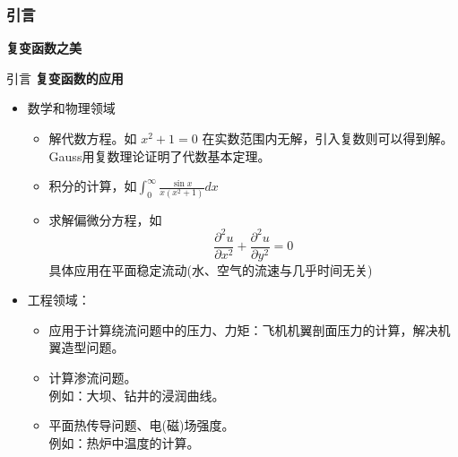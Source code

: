 \documentclass{beamer}
\begin{document}
\begin{frame}
\frametitle{引言} 
\textbf{复变函数之美}
\begin{figure}[H]
\centering  %
\subfigure[]{
\texttt{[image: 01]}}
\subfigure[]{
\texttt{[image: 02]}}
\subfigure[]{
\texttt{[image: 03]}}
\subfigure[]{
\texttt{[image: 05]}}
\subfigure[]{
\texttt{[image: 06]}}
\subfigure[]{
\texttt{[image: 04]}}
\end{figure}


\end{frame}

\begin{frame}{引言}
\textbf{复变函数的应用}
\begin{itemize}
    

    \item 数学和物理领域\\ 
    \begin{itemize}
    \item 解代数方程。如
        $x^2+1=0$    
    在实数范围内无解，引入复数则可以得到解。 \\
    Gauss用复数理论证明了代数基本定理。 
    \item 积分的计算，如$\int_0^\infty{\frac{\sin{x}}{x(x^2+1)}dx}$
    \item 求解偏微分方程，如 
        $$\frac{\partial^2{u}}{\partial{x^2}} + \frac{\partial^2{u}}{\partial{y^2}} =0 $$    
    具体应用在平面稳定流动(水、空气的流速与几乎时间无关)
    \end{itemize}


    \item 工程领域：\\ 
    \begin{itemize} 
    \item 应用于计算绕流问题中的压力、力矩：飞机机翼剖面压力的计算，解决机翼造型问题。
    \item 计算渗流问题。\\
      例如：大坝、钻井的浸润曲线。
    \item 平面热传导问题、电(磁)场强度。\\
      例如：热炉中温度的计算。
    \end{itemize}
    
\end{itemize}

\end{frame}
\end{document}
